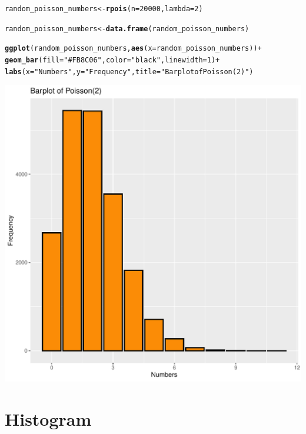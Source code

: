 \documentclass[11pt, a4paper]{article}\usepackage[]{graphicx}\usepackage[]{xcolor}
\makeatletter
\def\maxwidth{ %
  \ifdim\Gin@nat@width>\linewidth
    \linewidth
  \else
    \Gin@nat@width
  \fi
}
\newcommand{\hlnum}[1]{\textcolor[rgb]{0.686,0.059,0.569}{#1}}%
\newcommand{\hlstr}[1]{\textcolor[rgb]{0.192,0.494,0.8}{#1}}%
\newcommand{\hlopt}[1]{\textcolor[rgb]{0,0,0}{#1}}%
\newcommand{\hlstd}[1]{\textcolor[rgb]{0.345,0.345,0.345}{#1}}%
\newcommand{\hlkwb}[1]{\textcolor[rgb]{0.69,0.353,0.396}{#1}}%
\newcommand{\hlkwc}[1]{\textcolor[rgb]{0.333,0.667,0.333}{#1}}%
\newcommand{\hlkwd}[1]{\textcolor[rgb]{0.737,0.353,0.396}{\textbf{#1}}}%
\newenvironment{kframe}{%
 \def\at@end@of@kframe{}%
 \ifinner\ifhmode%
  \def\at@end@of@kframe{\end{minipage}}%
  \begin{minipage}{\columnwidth}%
 \fi\fi%
 \def\FrameCommand##1{\hskip\@totalleftmargin \hskip-\fboxsep
 \colorbox{shadecolor}{##1}\hskip-\fboxsep
     \hskip-\linewidth \hskip-\@totalleftmargin \hskip\columnwidth}%
 \MakeFramed {\advance\hsize-\width
   \@totalleftmargin\z@ \linewidth\hsize
   \@setminipage}}%
 {\par\unskip\endMakeFramed%
 \at@end@of@kframe}
\newenvironment{knitrout}{}{} %
\makeatother
\begin{document}
\begin{knitrout}
\color{fgcolor}\begin{kframe}
\begin{alltt}
\hlstd{random_poisson_numbers} \hlkwb{<-} \hlkwd{rpois}\hlstd{(}\hlkwc{n} \hlstd{=} \hlnum{20000}\hlstd{,} \hlkwc{lambda} \hlstd{=} \hlnum{2}\hlstd{)}

\hlstd{random_poisson_numbers} \hlkwb{<-} \hlkwd{data.frame}\hlstd{(random_poisson_numbers)}

\hlkwd{ggplot}\hlstd{(random_poisson_numbers,} \hlkwd{aes}\hlstd{(}\hlkwc{x} \hlstd{= random_poisson_numbers))} \hlopt{+}
    \hlkwd{geom_bar}\hlstd{(}\hlkwc{fill} \hlstd{=} \hlstr{"#FB8C06"}\hlstd{,} \hlkwc{color} \hlstd{=} \hlstr{"black"}\hlstd{,} \hlkwc{linewidth} \hlstd{=} \hlnum{1}\hlstd{)} \hlopt{+}
    \hlkwd{labs}\hlstd{(}\hlkwc{x} \hlstd{=} \hlstr{"Numbers"}\hlstd{,} \hlkwc{y} \hlstd{=} \hlstr{"Frequency"}\hlstd{,} \hlkwc{title} \hlstd{=} \hlstr{"Barplot of Poisson(2)"}\hlstd{)}
\end{alltt}
\end{kframe}
\includegraphics[width=\maxwidth]{figure/unnamed-chunk-20-1} 
\end{knitrout}

\newpage

\section*{Histogram}
\end{document}
